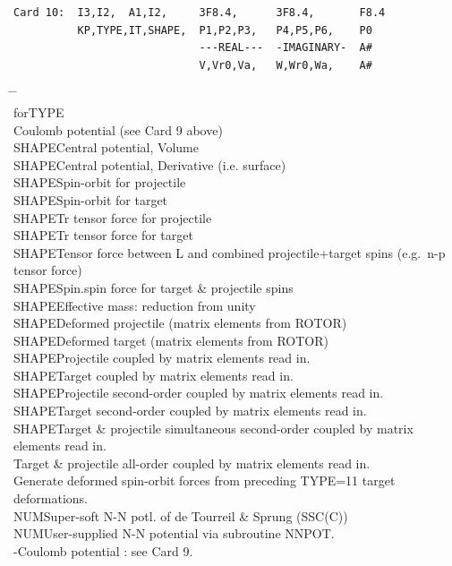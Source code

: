 \documentclass[11pt]{article}
\begin{document}
\begin{verbatim}
Card 10:  I3,I2,  A1,I2,     3F8.4,      3F8.4,       F8.4
          KP,TYPE,IT,SHAPE,  P1,P2,P3,   P4,P5,P6,    P0
                             ---REAL---  -IMAGINARY-  A#
                             V,Vr0,Va,   W,Wr0,Wa,    A#
\end{verbatim}
\vspace*{-10mm}
\begin{tabbing}
\hspace*{5mm} \= \hspace*{1cm} \= \hspace*{2cm} \=
\\
 for\>TYPE\\
\> \>Coulomb potential (see Card 9 above)\\
\>SHAPE\>Central potential, Volume\\
\>SHAPE\>Central potential, Derivative (i.e. surface)\\
\>SHAPE\>Spin-orbit for projectile\\
\>SHAPE\>Spin-orbit for target\\
\>SHAPE\>Tr tensor force for projectile\\
\>SHAPE\>Tr tensor force for target\\
\>SHAPE\>Tensor force between L and combined projectile+target spins
(e.g.~n-p tensor force)\\
\>SHAPE\>Spin.spin force for target \& projectile spins\\
\>SHAPE\>Effective mass: reduction from unity\\
\>SHAPE\>Deformed projectile   (matrix elements from ROTOR)\\
\>SHAPE\>Deformed target       (matrix elements from ROTOR)\\
\>SHAPE\>Projectile coupled by matrix elements read in.\\
\>SHAPE\>Target     coupled by matrix elements read in.\\
\>SHAPE\>Projectile second-order coupled by matrix elements read in.\\
\>SHAPE\>Target second-order coupled by matrix elements read in.\\
\>SHAPE\>Target \& projectile simultaneous second-order coupled by matrix elements read in.\\
\>     \>Target \& projectile all-order coupled by matrix elements read in.\\
\>     \>Generate deformed spin-orbit forces from preceding TYPE=11 target deformations.\\
\>NUM\>Super-soft N-N potl. of de Tourreil \& Sprung (SSC(C))\\
\>NUM\>User-supplied N-N potential via subroutine NNPOT.\\
\> -\>Coulomb potential : see Card 9.
\end{tabbing}
\end{document}
